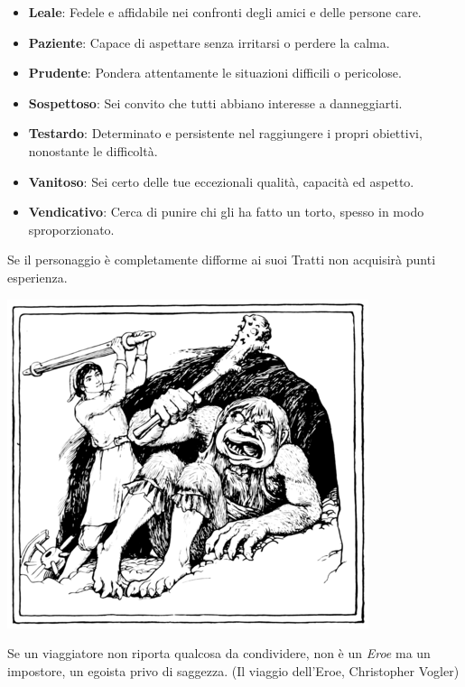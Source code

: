 \begin{multicols}{2}
\begin{itemize}[leftmargin=*]
	\item \textbf{Leale}: Fedele e affidabile nei confronti degli amici e delle persone care.
	\item \textbf{Paziente}: Capace di aspettare senza irritarsi o perdere la calma.
	\item \textbf{Prudente}: Pondera attentamente le situazioni difficili o pericolose.
	\item \textbf{Sospettoso}: Sei convito che tutti abbiano interesse a danneggiarti.
	\item \textbf{Testardo}: Determinato e persistente nel raggiungere i propri obiettivi, nonostante le difficoltà.
	\item \textbf{Vanitoso}: Sei certo delle tue eccezionali qualità, capacità ed aspetto.
	\item \textbf{Vendicativo}: Cerca di punire chi gli ha fatto un torto, spesso in modo sproporzionato.

\end{itemize}

\end{multicols}


\smallskip

Se il personaggio è completamente difforme ai suoi Tratti non acquisirà punti esperienza.

\vfill

\begin{center}
\includegraphics[height=0.3\linewidth]{immagini/troll.png}
\end{center}

\medskip

\begin{enfasi}{Se un viaggiatore non riporta qualcosa da condividere, non è un \emph{Eroe} ma un impostore, un egoista privo di saggezza. (Il viaggio dell'Eroe, Christopher Vogler)}\end{enfasi}

\pagebreak

